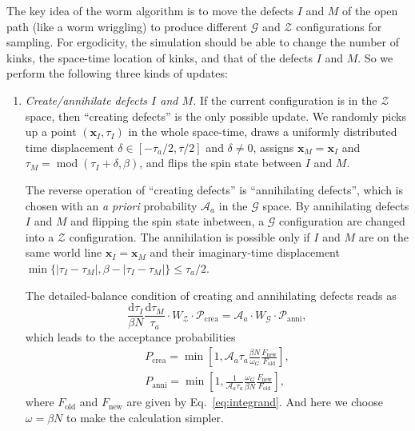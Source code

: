 \documentclass{article}
\DeclareMathOperator{\Mod}{mod}
\theoremstyle{plain} \newtheorem{thm}{Theorem}[section]
\theoremstyle{definition} \newtheorem{df}{Definition}[section]
\theoremstyle{definition} \newtheorem{eg}{Example}
\theoremstyle{remark} \newtheorem*{rmk}{Remark}
\begin{document}
The key idea of the worm algorithm is to move the defects $I$ and $M$ of the open path (like a worm wriggling) to produce different $\mathcal{G}$ and $\mathcal{Z}$ configurations for sampling. For ergodicity, the simulation should be able to change the number of kinks, the space-time location of kinks, and that of the defects $I$ and $M$. So we perform the following three kinds of updates:
\begin{enumerate}
  \item \textit{Create/annihilate defects $I$ and $M$.}
    If the current configuration is in the $\mathcal{Z}$ space, then ``creating defects'' is the only possible update. We randomly picks up a point $(\bm{x}_I, \tau_I)$ in the whole space-time, draws a uniformly distributed time displacement $\delta \in [-\tau_a/2, \tau/2]$ and $\delta \ne 0$, assigns $\bm{x}_M = \bm{x}_I$ and $\tau_M = \Mod(\tau_I+\delta, \beta)$, and flips the spin state between $I$ and $M$.

    The reverse operation of ``creating defects'' is ``annihilating defects'', which is chosen with an \textit{a priori} probability $\mathcal{A}_a$ in the $\mathcal{G}$ space. By annihilating defects $I$ and $M$ and flipping the spin state inbetween, a $\mathcal{G}$ configuration are changed into a $\mathcal{Z}$ configuration. The annihilation is possible only if $I$ and $M$ are on the same world line $\bm{x}_I = \bm{x}_M$ and their imaginary-time displacement $\min\{|\tau_I-\tau_M|, \beta-|\tau_I-\tau_M|\} \le \tau_a/2$.

    The detailed-balance condition of creating and annihilating defects reads as
    \begin{equation}
      \frac{\mathrm{d}\tau_I}{\beta N}\frac{\mathrm{d}\tau_M}{\tau_a}\cdot W_\mathcal{Z}\cdot\mathcal{P}_\text{crea} = \mathcal{A}_a\cdot W_\mathcal{G}\cdot\mathcal{P}_\text{anni},
    \end{equation}
    which leads to the acceptance probabilities
    \begin{gather}
      P_\text{crea} = \min \left[ 1, \mathcal{A}_a \tau_a \frac{\beta N}{\omega_G}\frac{F_\text{new}}{F_\text{old}} \right],\\
      P_\text{anni} = \min\left[ 1, \frac{1}{\mathcal{A}_a \tau_a}\frac{\omega_G}{\beta N}\frac{F_\text{new}}{F_\text{old}} \right],
    \end{gather}
    where $F_\text{old}$ and $F_\text{new}$ are given by Eq.~\ref{eq:integrand}. And here we choose $\omega = \beta N$ to make the calculation simpler.


\end{enumerate}
\end{document}
